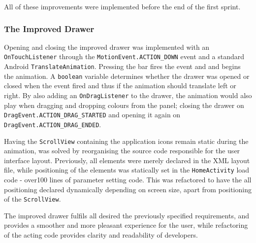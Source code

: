 All of these improvements were implemented before the end of the first sprint. 

\subsubsection{The Improved Drawer}

Opening and closing the improved drawer was implemented with an \lstinline{OnTouchListener} through the \lstinline{MotionEvent.ACTION_DOWN} event and a standard Android \lstinline{TranslateAnimation}.
Pressing the bar fires the event and and begins the animation.
A \lstinline{boolean} variable determines whether the drawer was opened or closed when the event fired and thus if the animation should translate left or right.
By also adding an \lstinline{OnDragListener} to the drawer, the animation would also play when dragging and dropping colours from the panel; closing the drawer on \lstinline{DragEvent.ACTION_DRAG_STARTED} and opening it again on \lstinline{DragEvent.ACTION_DRAG_ENDED}.

Having the \lstinline{ScrollView} containing the application icons remain static during the animation, was solved by reorganising the source code responsible for the user interface layout. 
Previously, all elements were merely declared in the XML layout file, while positioning of the elements was statically set in the \lstinline{HomeActivity} load code - over100 lines of parameter setting code.
This was refactored to have the all positioning declared dynamically depending on screen size, apart from positioning of the \lstinline{ScrollView}.

The improved drawer fulfils all desired the previously specified requirements, and provides a smoother and more pleasant experience for the user, while refactoring of the acting code provides clarity and readability of developers.

